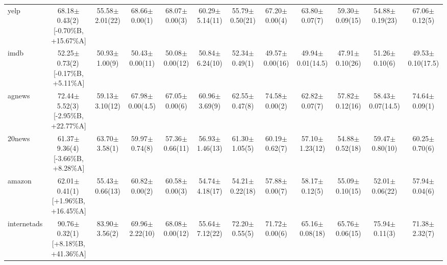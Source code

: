 \documentclass[conference]{IEEEtran}
\begin{document}
\begin{table}
{\begin{tabular}{lccccccccccc}
				yelp & 68.18$\pm$0.43(2)\,[{-}0.70\%B, {+}15.67\%A] & 55.58$\pm$2.01(22) & 68.66$\pm$0.00(1) & 68.07$\pm$0.00(3) & 60.29$\pm$5.14(11) & 55.79$\pm$0.50(21) & 67.20$\pm$0.00(4) & 63.80$\pm$0.07(7) & 59.30$\pm$0.09(15) & 54.88$\pm$0.19(23) & 67.06$\pm$0.12(5) \\
				imdb & 52.25$\pm$0.73(2)\,[{-}0.17\%B, {+}5.11\%A] & 50.93$\pm$1.00(9) & 50.43$\pm$0.00(11) & 50.08$\pm$0.00(12) & 50.84$\pm$6.24(10) & 52.34$\pm$0.49(1) & 49.57$\pm$0.00(16) & 49.94$\pm$0.01(14.5) & 47.91$\pm$0.10(26) & 51.26$\pm$0.10(6) & 49.53$\pm$0.10(17.5) \\
				agnews & 72.44$\pm$5.52(3)\,[{-}2.95\%B, {+}22.77\%A] & 59.13$\pm$3.10(12) & 67.98$\pm$0.00(4.5) & 67.05$\pm$0.00(6) & 60.96$\pm$3.69(9) & 62.55$\pm$0.47(8) & 74.58$\pm$0.00(2) & 62.82$\pm$0.07(7) & 57.82$\pm$0.12(16) & 58.43$\pm$0.07(14.5) & 74.64$\pm$0.09(1) \\
				20news & 61.37$\pm$9.36(4)\,[{-}3.66\%B, {+}8.28\%A] & 63.70$\pm$3.58(1) & 59.97$\pm$0.74(8) & 57.36$\pm$0.66(11) & 56.93$\pm$1.46(13) & 61.30$\pm$1.05(5) & 60.19$\pm$0.62(7) & 57.10$\pm$1.23(12) & 54.88$\pm$0.52(18) & 59.47$\pm$0.80(10) & 60.25$\pm$0.70(6) \\
				amazon & 62.01$\pm$0.41(1)\,[{+}1.96\%B, {+}16.45\%A] & 55.43$\pm$0.66(13) & 60.82$\pm$0.00(2) & 60.58$\pm$0.00(3) & 54.74$\pm$4.18(17) & 54.21$\pm$0.22(18) & 57.88$\pm$0.00(7) & 58.17$\pm$0.12(5) & 55.09$\pm$0.10(15) & 52.01$\pm$0.06(22) & 57.94$\pm$0.04(6) \\
				internetads & 90.76$\pm$0.32(1)\,[{+}8.18\%B, {+}41.36\%A] & 83.90$\pm$3.56(2) & 69.96$\pm$2.22(10) & 68.08$\pm$0.00(12) & 55.64$\pm$7.12(22) & 72.20$\pm$0.55(5) & 71.72$\pm$0.00(6) & 65.16$\pm$0.08(18) & 65.76$\pm$0.06(15) & 75.94$\pm$0.11(3) & 71.38$\pm$2.32(7) \\
				\bottomrule
			\end{tabular}%
		}
	\end{table}
\end{document}
